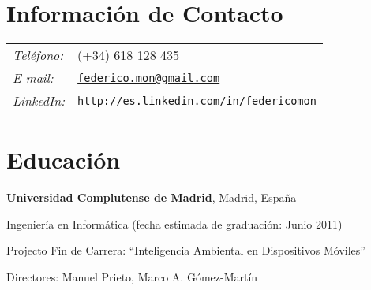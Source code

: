 \documentclass[margin,line]{resume}
\begin{document}

\begin{resume}
\section{\sc Información de Contacto}
\vspace{.05in}
\begin{tabular}{@{}p{0.5in}p{2in}}
{\it Teléfono:} &(+34) 618 128 435 \\
{\it E-mail:} &{ \tt \href{mailto:federico.mon@gmail.com}{federico.mon@gmail.com}}\\
{\it LinkedIn:} &{ \tt \href{http://es.linkedin.com/in/federicomon}{http://es.linkedin.com/in/federicomon}}\\
\end{tabular}



\section{\sc Educación}
{\bf Universidad Complutense de Madrid}, Madrid, España\\
\vspace*{-.1in}
\begin{list1}
\item[] Ingeniería en Informática (fecha estimada
  de graduación: Junio 2011)
\begin{list2}
\vspace*{.05in}
\item Projecto Fin de Carrera:  ``Inteligencia Ambiental en Dispositivos Móviles'' 
\item Directores:  Manuel Prieto, Marco A. Gómez-Martín
\end{list2}
\end{list1}


\end{resume}
\end{document}
